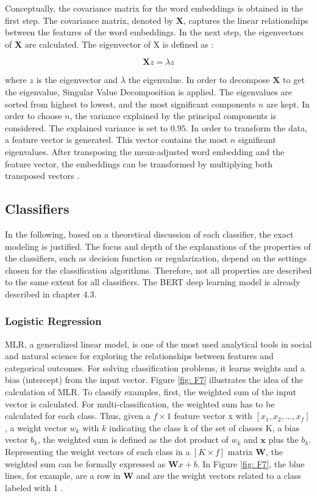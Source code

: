 \documentclass[12pt, a4paper, titlepage]{article}
\begin{document}
Conceptually, the covariance matrix for the word embeddings is obtained in the first step. The covariance matrix, denoted by $\textbf{X}$, captures the linear relationships between the features of the word embeddings. In the next step, the eigenvectors of $\textbf{X}$ are calculated. The eigenvector of X is defined as \citep{bro2014}: 

\[ \textbf{X}z = \lambda z \]

where $z$ is the eigenvector and $\lambda$ the eigenvalue. In order to decompose $\textbf{X}$ to get the eigenvalue, Singular Value Decomposition is applied. The eigenvalues are sorted from highest to lowest, and the most significant components $n$ are kept. In order to choose $n$, the variance explained by the principal components is considered. The explained variance is set to $0.95$. In order to transform the data, a feature vector is generated. This vector contains the most $n$ significant eigenvalues. After transposing the mean-adjusted word embedding and the feature vector, the embeddings can be transformed by multiplying both transposed vectors \citep{smith2002}. 

\subsection{Classifiers}
In the following, based on a theoretical discussion of each classifier, the exact modeling is justified. The focus and depth of the explanations of the properties of the classifiers, such as decision function or regularization, depend on the settings chosen for the classification algorithms. Therefore, not all properties are described to the same extent for all classifiers. The \ac{BERT} deep learning model is already described in chapter 4.3. 

\subsubsection*{Logistic Regression}
\ac{MLR}, a generalized linear model, is one of the most used analytical tools in social and natural science for exploring the relationships between features and categorical outcomes. For solving classification problems, it learns weights and a bias (intercept) from the input vector. Figure \ref{fig: F7} illustrates the idea of the calculation of \ac{MLR}. To classify examples, first, the weighted sum of the input vector is calculated. For multi-classification, the weighted sum has to be calculated for each class. Thus, given a $f \times 1$ feature vector x with $[x_1, x_2, ..., x_f]$, a weight vector $w_k$ with $k$ indicating the class k of the set of classes K, a bias vector $b_k$, the weighted sum is defined as the dot product of $w_k$ and $\textbf{x}$ plus the $b_k$. Representing the weight vectors of each class in a $[K \times f]$ matrix $\textbf{W}$, the weighted sum can be formally expressed as $\textbf{W}x+b$. In Figure \ref{fig: F7}, the blue lines, for example, are a row in $\textbf{W}$ and are the weight vectors related to a class labeled with 1 \citep{jurafsky2021}.
\end{document}
